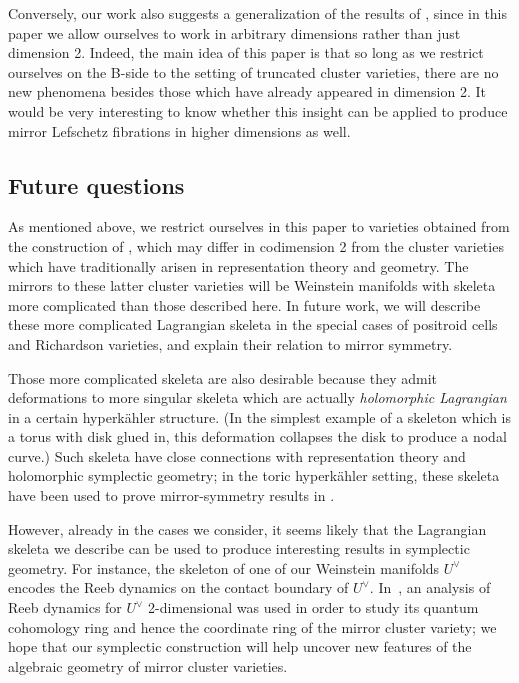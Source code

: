 \documentclass[pdftex]{sigma}%
\numberwithin{equation}{section}
\begin{document}
Conversely, our work also suggests a generalization of the results of \cite{HK20}, since in this paper we allow ourselves to work in arbitrary dimensions rather than just dimension 2. Indeed, the main idea of this paper is that so long as we restrict ourselves on the B-side to the setting of truncated cluster varieties, there are no new phenomena besides those which have already appeared in dimension 2.
It would be very interesting to know whether this insight can be applied to produce mirror Lefschetz fibrations in higher dimensions as well.

\subsection{Future questions}\label{subsec:future}
As mentioned above, we restrict ourselves in this paper to varieties obtained from the construction of \cite{GHK2}, which may
differ in codimension 2 from the cluster varieties which have traditionally arisen in representation theory and geometry.
The mirrors to these latter cluster varieties will be Weinstein manifolds with skeleta more complicated than those described here.
In future work, we will describe these more complicated Lagrangian skeleta in the special cases of positroid cells and Richardson varieties, and explain their relation to mirror symmetry.

Those more complicated skeleta are also desirable because they admit deformations to more singular skeleta which are actually {\em holomorphic Lagrangian} in a certain hyperk\"ahler structure. (In the simplest example of a skeleton which is a torus with disk glued in, this deformation collapses the disk to produce a nodal curve.) Such skeleta have close connections with representation theory and holomorphic symplectic geometry; in the toric hyperk\"ahler setting, these skeleta have been used to prove mirror-symmetry results in \cite{GMW19,MW18}.

However, already in the cases we consider, it seems likely that the Lagrangian skeleta we describe can be used to produce interesting results in symplectic geometry. For instance, the skeleton of one of our Weinstein manifolds $U^\vee$ encodes the Reeb dynamics on the contact boundary of $U^\vee$. In~\cite{Pasc-SH}, an analysis of Reeb dynamics for $U^\vee$ 2-dimensional was used in order to study its quantum cohomology ring and hence the coordinate ring of the mirror cluster variety; we hope that our symplectic construction will help uncover new features of the algebraic geometry of mirror cluster varieties.
\end{document}
